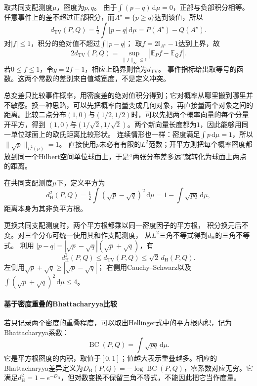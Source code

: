 取共同支配测度\(\mu\)，密度为\(p,q\)。
由于\(\int(p-q)\,\mathrm d\mu=0\)，正部与负部积分相等。
任意事件上的差不超过正部积分，而\(A^\star=\{p\geq q\}\)达到该值，所以
\begin{equation}
  d_{\mathrm{TV}}(P,Q)=\tfrac12\int|p-q|\,\mathrm d\mu
   =P(A^\star)-Q(A^\star).
  \label{eq:information-tv-density}
\end{equation}
对\(|f|\leq1\)，积分的绝对值不超过\(\int|p-q|\)；
取\(f=2\mathbb I_{A^\star}-1\)达到上界，故
\begin{equation}
  2d_{\mathrm{TV}}(P,Q)
   =\sup_{\|f\|_\infty\leq1}|\mathbb E_Pf-\mathbb E_Qf|.
  \label{eq:information-tv-dual}
\end{equation}
若\(0\leq f\leq1\)，令\(g=2f-1\)，相应上确界则恰为\(d_{\mathrm{TV}}\)。
事件指标给出取等号的函数。这两个常数的差别来自值域宽度，不是定义冲突。

总变差只比较事件概率，用密度差的绝对值积分得到；它对概率从哪里搬到哪里并不敏感。换一种思路，可以先把概率向量变成几何对象，再直接量两个对象之间的距离。比较二点分布\((1,0)\)与\((1/2,1/2)\)时，可以先把两个概率向量的每个分量开平方，得到
\((1,0)\)与\((1/\sqrt2,1/\sqrt2)\)。两个新向量长度都为\(1\)，因此能够用同一单位球面上的欧氏距离比较形状。
连续情形也一样：密度满足\(\int p\,\mathrm d\mu=1\)，所以\(\|\sqrt p\|_{L^2(\mu)}=1\)。
直接使用\(p\)未必有有限的\(L^2\)范数；开平方则把每个概率密度都放到同一个Hilbert空间单位球面上，于是“两张分布差多远”就转化为球面上两点的距离。

\begin{definition}[Hellinger距离]
\label{def:information-hellinger-distance}
在共同支配测度\(\mu\)下，定义平方为
\begin{equation}
  d_{\mathrm H}^2(P,Q)=\tfrac12\int(\sqrt p-\sqrt q)^2\,\mathrm d\mu
   =1-\int\sqrt{pq}\,\mathrm d\mu,
  \label{eq:information-hellinger}
\end{equation}
距离本身为其非负平方根。
\end{definition}
更换共同支配测度时，两个平方根都乘以同一密度因子的平方根，
积分换元后不变。对三个分布可统一使用其和作支配测度，
从\(L^2\)三角不等式得到\(d_{\mathrm H}\)的三角不等式。
利用
\(|p-q|=|\sqrt p-\sqrt q|(\sqrt p+\sqrt q)\)，有
\[
  d_{\mathrm H}^2(P,Q)\leq d_{\mathrm{TV}}(P,Q)
  \leq\sqrt2\,d_{\mathrm H}(P,Q).
\]
左侧用\(\sqrt p+\sqrt q\geq|\sqrt p-\sqrt q|\)；
右侧用Cauchy--Schwarz以及
\(\int(\sqrt p+\sqrt q)^2\,\mathrm d\mu\leq4\)。

\paragraph{基于密度重叠的Bhattacharyya比较}
若只记录两个密度的重叠程度，可以取出Hellinger式中的平方根内积，记为Bhattacharyya系数：
\[
  \operatorname{BC}(P,Q)=\int\sqrt{pq}\,\mathrm d\mu.
\]
它是平方根密度的内积，取值于\([0,1]\)；值越大表示重叠越多。相应的Bhattacharyya差异定义为\(D_{\mathrm B}(P,Q)=-\log\operatorname{BC}(P,Q)\)，零系数对应无穷。它满足\(d_{\mathrm H}^2=1-e^{-D_{\mathrm B}}\)，但对数变换不保留三角不等式，不能因此把它当作度量。

